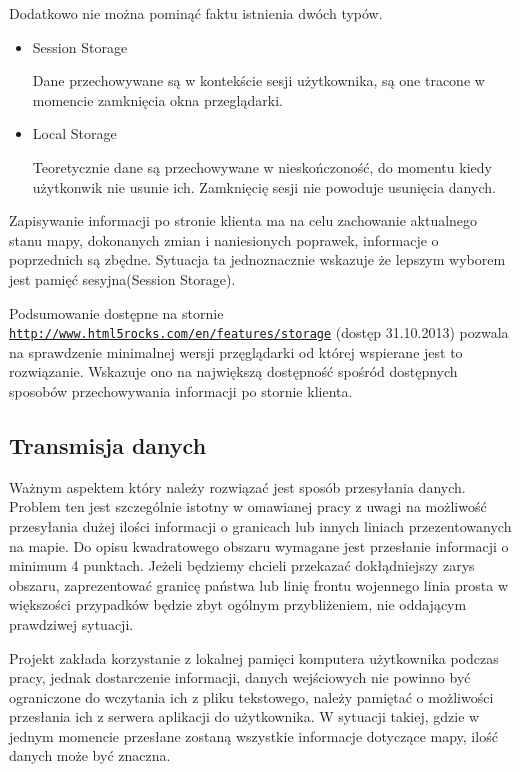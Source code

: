 Dodatkowo nie można pominąć faktu istnienia dwóch typów.
\begin{itemize}

\item
Session Storage

Dane przechowywane są w kontekście sesji użytkownika, są one tracone w momencie zamknięcia okna przeglądarki.

\item
Local Storage

Teoretycznie dane są przechowywane w nieskończoność, do momentu kiedy użytkonwik nie usunie ich. Zamknięcię sesji nie powoduje usunięcia danych.

\end{itemize}

Zapisywanie informacji po stronie klienta ma na celu zachowanie aktualnego stanu mapy, dokonanych zmian i naniesionych poprawek, informacje o poprzednich są zbędne. Sytuacja ta jednoznacznie wskazuje że lepszym wyborem jest pamięć sesyjna(Session Storage).



Podsumowanie dostępne na stornie \underline{\texttt{http://www.html5rocks.com/en/features/storage}} (dostęp 31.10.2013) pozwala na sprawdzenie minimalnej wersji przęglądarki od której wspierane jest to rozwiązanie. Wskazuje ono na największą dostępność spośród dostępnych sposobów przechowywania informacji po stornie klienta.

\subsection{Transmisja danych}
\label{subsec:transmisjaDanych}

Ważnym aspektem który należy rozwiązać jest sposób przesyłania danych. Problem ten jest szczególnie istotny w omawianej pracy z uwagi na możliwość przesyłania dużej ilości informacji o granicach lub innych liniach przezentowanych na mapie. Do opisu kwadratowego obszaru wymagane jest przesłanie informacji o minimum 4 punktach. Jeżeli będziemy chcieli przekazać dokłądniejszy zarys obszaru, zaprezentować granicę państwa lub linię frontu wojennego linia prosta w większości przypadków będzie zbyt ogólnym przybliżeniem, nie oddającym prawdziwej sytuacji.

Projekt zakłada korzystanie z lokalnej pamięci komputera użytkownika podczas pracy, jednak dostarczenie informacji, danych wejściowych nie powinno być ograniczone do wczytania ich z pliku tekstowego, należy pamiętać o możliwości przesłania ich z serwera aplikacji do użytkownika. W sytuacji takiej, gdzie w jednym momencie przesłane zostaną wszystkie informacje dotyczące mapy, ilość danych może być znaczna.

